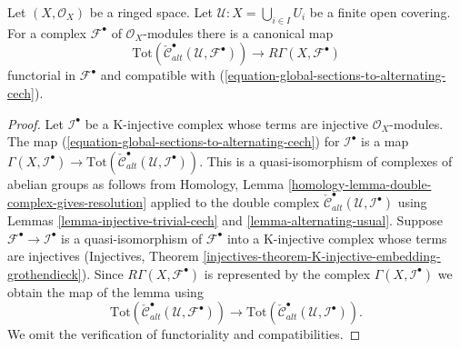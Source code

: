 \begin{lemma}
\label{lemma-alternating-cech-complex-complex}
Let $(X, \mathcal{O}_X)$ be a ringed space.
Let $\mathcal{U} : X = \bigcup_{i \in I} U_i$ be
a finite open covering. For a complex $\mathcal{F}^\bullet$
of $\mathcal{O}_X$-modules there is a canonical map
$$
\text{Tot}(\check{\mathcal{C}}^\bullet_{alt}(\mathcal{U}, \mathcal{F}^\bullet))
\longrightarrow
R\Gamma(X, \mathcal{F}^\bullet)
$$
functorial in $\mathcal{F}^\bullet$ and compatible with
(\ref{equation-global-sections-to-alternating-cech}).
\end{lemma}

\begin{proof}
Let ${\mathcal I}^\bullet$ be a K-injective complex whose terms
are injective $\mathcal{O}_X$-modules.
The map (\ref{equation-global-sections-to-alternating-cech}) for
$\mathcal{I}^\bullet$ is a map
$\Gamma(X, {\mathcal I}^\bullet) \to
\text{Tot}(\check{\mathcal{C}}^\bullet_{alt}({\mathcal U},
{\mathcal I}^\bullet))$.
This is a quasi-isomorphism of complexes of abelian groups
as follows from
Homology, Lemma \ref{homology-lemma-double-complex-gives-resolution}
applied to the double complex
$\check{\mathcal{C}}^\bullet_{alt}({\mathcal U},
{\mathcal I}^\bullet)$ using
Lemmas \ref{lemma-injective-trivial-cech} and \ref{lemma-alternating-usual}.
Suppose ${\mathcal F}^\bullet \to {\mathcal I}^\bullet$ is a quasi-isomorphism
of ${\mathcal F}^\bullet$ into a K-injective complex whose terms
are injectives (Injectives, Theorem
\ref{injectives-theorem-K-injective-embedding-grothendieck}).
Since $R\Gamma(X, {\mathcal F}^\bullet)$ is represented by the complex
$\Gamma(X, {\mathcal I}^\bullet)$ we obtain the map of the lemma
using
$$
\text{Tot}(\check{\mathcal{C}}^\bullet_{alt}({\mathcal U},
{\mathcal F}^\bullet))
\longrightarrow
\text{Tot}(\check{\mathcal{C}}^\bullet_{alt}({\mathcal U},
{\mathcal I}^\bullet)).
$$
We omit the verification of functoriality and compatibilities.
\end{proof}

